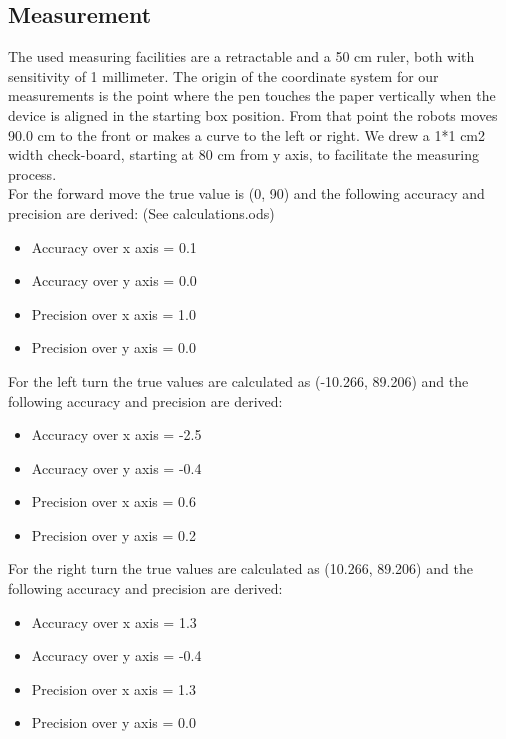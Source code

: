 \documentclass{scrartcl}
\begin{document}
\subsection{Measurement}
The used measuring facilities are a retractable and a 50 cm ruler, both with sensitivity of 1 millimeter. The origin of the coordinate system for our measurements is the point where the pen touches the paper vertically when the device is aligned in the starting box position. From that point the robots moves 90.0 cm to the front or makes a curve to the left or right. We drew a 1*1 cm2 width check-board, starting at 80 cm from y axis, to facilitate the measuring process.\\

For the forward move the true value is (0, 90) and the following accuracy and precision are derived: (See calculations.ods)
\begin{itemize}
\item	Accuracy over x axis  = 0.1
\item	Accuracy over y axis  = 0.0

\item	Precision over x axis = 1.0
\item	Precision over y axis = 0.0
\end{itemize}


For the left turn the true values are calculated as (-10.266, 89.206) and the following accuracy and precision are derived:

\begin{itemize}	
\item	Accuracy over x axis  = -2.5
\item	Accuracy over y axis  = -0.4

\item	Precision over x axis = 0.6
\item	Precision over y axis = 0.2
\end{itemize}


For the right turn the true values are calculated as (10.266, 89.206) and the following accuracy and precision are derived:

\begin{itemize}	
\item	Accuracy over x axis  = 1.3
\item	Accuracy over y axis  = -0.4

\item	Precision over x axis = 1.3
\item	Precision over y axis = 0.0
\end{itemize}
\end{document}
